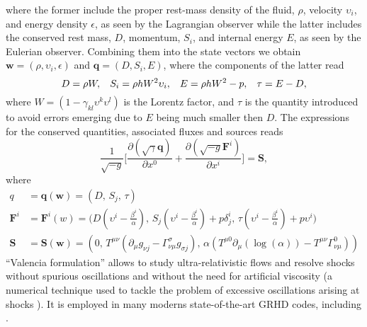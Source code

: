 where the former include the proper rest-mass density of the fluid, $\rho$, 
velocity $\upsilon_i$, and  energy density $\epsilon$, as seen by the 
Lagrangian observer 
while the latter includes 
the conserved rest mass, $D$, momentum, $S_i$, and internal energy $E$, as 
seen by the Eulerian observer.
Combining them into the state vectors we obtain $\boldsymbol{w}=(\rho,\upsilon_i,\epsilon)$ 
and $\boldsymbol{q}=(D,S_i,E)$, where the components of the latter read
%
\begin{equation}
    D = \rho W, \hspace{3mm} S_i = \rho h W^2 \upsilon_i, \hspace{3mm} E = \rho h W^2 - p, \hspace{3mm} \tau = E - D,
\end{equation}
%
%
where $W = (1 - \gamma_{kl}\upsilon^k\upsilon^l)$ is the Lorentz factor, and $\tau$ is the
quantity introduced to avoid errors emerging due to $E$ being much smaller then $D$. 
%
The expressions for the conserved quantities, associated fluxes and sources reads 
%
\begin{equation}
\frac{1}{\sqrt{-g}}\Big[\frac{\partial(\sqrt{\gamma}\boldsymbol{q})}{\partial x^0} + \frac{\partial(\sqrt{-g}\boldsymbol{F}^{i})}{\partial x^i}\Big] = \boldsymbol{S},
\label{eq:theory:valencia} %
\end{equation}
%
where 
%
\begin{subequations}
    \begin{align}
    q &= \boldsymbol{q}(\boldsymbol{w}) = (D,\, S_j,\, \tau) \label{eq:theory:grhd_q}\\
    \boldsymbol{F}^i &= \boldsymbol{F}^i(w) = \Big( D(\upsilon^i-\frac{\beta^i}{\alpha}),\, S_j(\upsilon^i-\frac{\beta^i}{\alpha}) + p\delta^i_j,\, \tau(\upsilon^i-\frac{\beta^i}{\alpha})+p\upsilon^i \Big) \label{eq:theory:grhd_Fi}\\
    \boldsymbol{S} &= \boldsymbol{S}(\boldsymbol{w})=(0,\,  T^{\mu\nu}(\partial_{\mu}g_{\nu j} - \Gamma^{\sigma}_{\nu\mu}g_{\sigma j}),\,  \alpha(T^{\mu 0}\partial_{\mu}(\log(\alpha)) - T^{\mu\nu}\Gamma^0_{\nu\mu})) \label{eq:theory:grhd_S}
    \end{align}
\end{subequations}
%
``Valencia formulation'' allows to study ultra-relativistic flows and resolve shocks without
spurious oscillations and without the need for artificial viscosity (a numerical technique used to 
tackle the problem of excessive oscillations arising at shocks \citep[\eg][]{Font:2008fka}).
%
It is employed in many moderns state-of-the-art \ac{GRHD} codes, including \wisky{}. 

